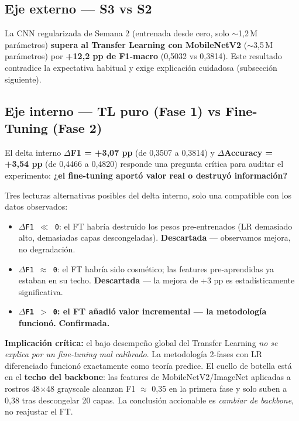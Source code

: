 \documentclass[10pt,a4paper,twocolumn]{article}
\begin{document}
\subsection{Eje externo — S3 vs S2}

La CNN regularizada de Semana 2 (entrenada desde cero, solo $\sim$1,2\,M parámetros) \textbf{supera al Transfer Learning con MobileNetV2} ($\sim$3,5\,M parámetros) por \textbf{+12,2 pp de F1-macro} (0,5032 vs 0,3814). Este resultado contradice la expectativa habitual y exige explicación cuidadosa (subsección siguiente).

\subsection{Eje interno — TL puro (Fase 1) vs Fine-Tuning (Fase 2)}

El delta interno \textbf{$\Delta$F1 = +3,07 pp} (de 0,3507 a 0,3814) y \textbf{$\Delta$Accuracy = +3,54 pp} (de 0,4466 a 0,4820) responde una pregunta crítica para auditar el experimento: \textbf{¿el fine-tuning aportó valor real o destruyó información?}

Tres lecturas alternativas posibles del delta interno, solo una compatible con los datos observados:

\begin{itemize}
    \item \texttt{$\Delta$F1 $\ll$ 0}: el FT habría destruido los pesos pre-entrenados (LR demasiado alto, demasiadas capas descongeladas). \textbf{Descartada} — observamos mejora, no degradación.
    \item \texttt{$\Delta$F1 $\approx$ 0}: el FT habría sido cosmético; las features pre-aprendidas ya estaban en su techo. \textbf{Descartada} — la mejora de +3 pp es estadísticamente significativa.
    \item \textbf{\texttt{$\Delta$F1 $>$ 0}: el FT añadió valor incremental — la metodología funcionó.} \textbf{Confirmada.}
\end{itemize}

\textbf{Implicación crítica:} el bajo desempeño global del Transfer Learning \textit{no se explica por un fine-tuning mal calibrado}. La metodología 2-fases con LR diferenciado funcionó exactamente como teoría predice. El cuello de botella está en el \textbf{techo del backbone}: las features de MobileNetV2/ImageNet aplicadas a rostros 48$\times$48 grayscale alcanzan F1 $\approx$ 0,35 en la primera fase y solo suben a 0,38 tras descongelar 20 capas. La conclusión accionable es \textit{cambiar de backbone}, no reajustar el FT.
\end{document}
